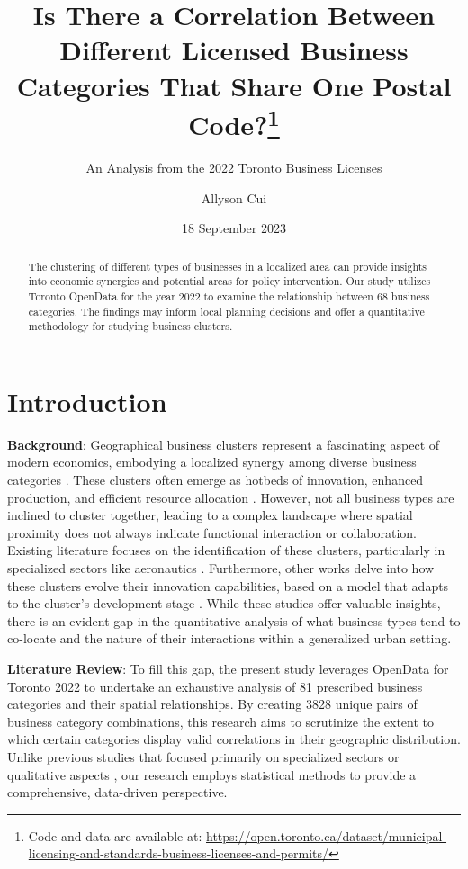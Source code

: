 \documentclass[
]{article}
\title{Is There a Correlation Between Different Licensed Business Categories That Share One Postal Code?\thanks{Code and data are available at: \url{https://open.toronto.ca/dataset/municipal-licensing-and-standards-business-licenses-and-permits/}}}
\subtitle{An Analysis from the 2022 Toronto Business Licenses}
\author{Allyson Cui}
\date{18 September 2023}
\begin{document}
\maketitle
\begin{abstract}
The clustering of different types of businesses in a localized area can provide insights into economic synergies and potential areas for policy intervention. Our study utilizes Toronto OpenData for the year 2022 to examine the relationship between 68 business categories. The findings may inform local planning decisions and offer a quantitative methodology for studying business clusters.
\end{abstract}

{
\setcounter{tocdepth}{2}
\tableofcontents
}
\hypertarget{introduction}{%
\section{Introduction}\label{introduction}}

\textbf{Background}: Geographical business clusters represent a fascinating aspect of modern economics, embodying a localized synergy among diverse business categories \citep{CARBONARA2005213}. These clusters often emerge as hotbeds of innovation, enhanced production, and efficient resource allocation \citep{Lublinski2002}. However, not all business types are inclined to cluster together, leading to a complex landscape where spatial proximity does not always indicate functional interaction or collaboration. Existing literature focuses on the identification of these clusters, particularly in specialized sectors like aeronautics \citep{Lublinski2002}. Furthermore, other works delve into how these clusters evolve their innovation capabilities, based on a model that adapts to the cluster's development stage \citep{Bittencourt2019}. While these studies offer valuable insights, there is an evident gap in the quantitative analysis of what business types tend to co-locate and the nature of their interactions within a generalized urban setting.

\textbf{Literature Review}: To fill this gap, the present study leverages OpenData for Toronto 2022 to undertake an exhaustive analysis of 81 prescribed business categories and their spatial relationships. By creating 3828 unique pairs of business category combinations, this research aims to scrutinize the extent to which certain categories display valid correlations in their geographic distribution. Unlike previous studies that focused primarily on specialized sectors or qualitative aspects \citep[\citet{Bittencourt2019}]{Lublinski2002}, our research employs statistical methods to provide a comprehensive, data-driven perspective.
\end{document}

